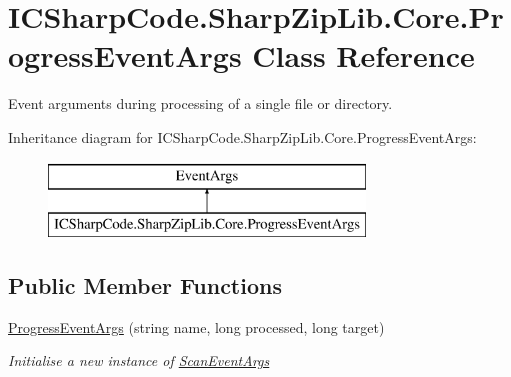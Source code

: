 \hypertarget{class_i_c_sharp_code_1_1_sharp_zip_lib_1_1_core_1_1_progress_event_args}{}\section{I\+C\+Sharp\+Code.\+Sharp\+Zip\+Lib.\+Core.\+Progress\+Event\+Args Class Reference}
\label{class_i_c_sharp_code_1_1_sharp_zip_lib_1_1_core_1_1_progress_event_args}


Event arguments during processing of a single file or directory.  


Inheritance diagram for I\+C\+Sharp\+Code.\+Sharp\+Zip\+Lib.\+Core.\+Progress\+Event\+Args\+:\begin{figure}[H]
\begin{center}
\leavevmode
\includegraphics[height=2.000000cm]{class_i_c_sharp_code_1_1_sharp_zip_lib_1_1_core_1_1_progress_event_args}
\end{center}
\end{figure}
\subsection*{Public Member Functions}
\begin{DoxyCompactItemize}
\item 
\hyperlink{class_i_c_sharp_code_1_1_sharp_zip_lib_1_1_core_1_1_progress_event_args_a3f648cae095652121ec104b3675cee16}{Progress\+Event\+Args} (string name, long processed, long target)
\begin{DoxyCompactList}\small\item\em Initialise a new instance of \hyperlink{class_i_c_sharp_code_1_1_sharp_zip_lib_1_1_core_1_1_scan_event_args}{Scan\+Event\+Args} \end{DoxyCompactList}\end{DoxyCompactItemize}
